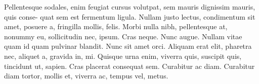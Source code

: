Pellentesque sodales, enim feugiat cursus volutpat, sem mauris dignissim mauris, quis conse- quat sem est fermentum ligula. Nullam justo lectus, condimentum sit amet, posuere a, fringilla mollis, felis. Morbi nulla nibh, pellentesque at, nonummy eu, sollicitudin nec, ipsum. Cras neque. Nunc augue. Nullam vitae quam id quam pulvinar blandit. Nunc sit amet orci. Aliquam erat elit, pharetra nec, aliquet a, gravida in, mi. Quisque urna enim, viverra quis, suscipit quis, tincidunt ut, sapien. Cras placerat consequat sem. Curabitur ac diam. Curabitur diam tortor, mollis et, viverra ac, tempus vel, metus.
